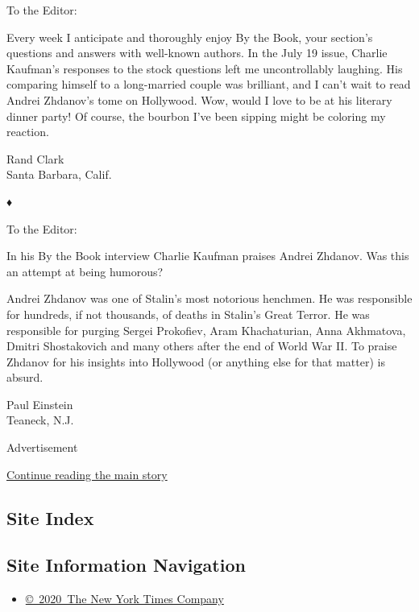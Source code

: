 To the Editor:

Every week I anticipate and thoroughly enjoy By the Book, your section's
questions and answers with well-known authors. In the July 19 issue,
Charlie Kaufman's responses to the stock questions left me
uncontrollably laughing. His comparing himself to a long-married couple
was brilliant, and I can't wait to read Andrei Zhdanov's tome on
Hollywood. Wow, would I love to be at his literary dinner party! Of
course, the bourbon I've been sipping might be coloring my reaction.

Rand Clark\\
Santa Barbara, Calif.

♦

To the Editor:

In his By the Book interview Charlie Kaufman praises Andrei Zhdanov. Was
this an attempt at being humorous?

Andrei Zhdanov was one of Stalin's most notorious henchmen. He was
responsible for hundreds, if not thousands, of deaths in Stalin's Great
Terror. He was responsible for purging Sergei Prokofiev, Aram
Khachaturian, Anna Akhmatova, Dmitri Shostakovich and many others after
the end of World War II. To praise Zhdanov for his insights into
Hollywood (or anything else for that matter) is absurd.

Paul Einstein\\
Teaneck, N.J.

Advertisement

\protect\hyperlink{after-bottom}{Continue reading the main story}

\hypertarget{site-index}{%
\subsection{Site Index}\label{site-index}}

\hypertarget{site-information-navigation}{%
\subsection{Site Information
Navigation}\label{site-information-navigation}}

\begin{itemize}
\tightlist
\item
  \href{https://help.nytimes3xbfgragh.onion/hc/en-us/articles/115014792127-Copyright-notice}{©~2020~The
  New York Times Company}
\end{itemize}

